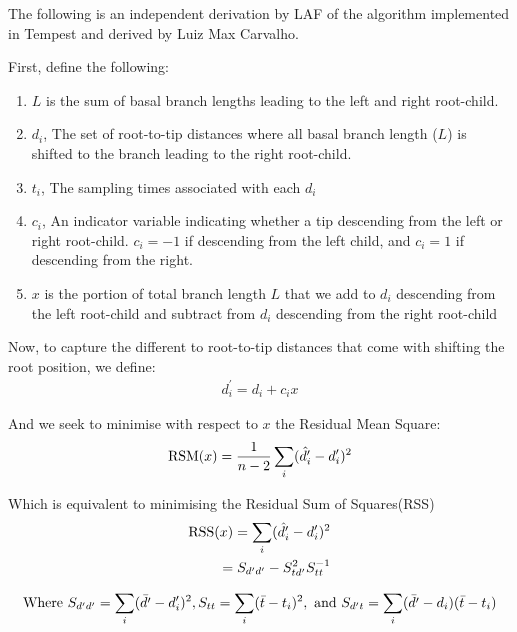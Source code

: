 \documentclass{article}
\begin{document}
The following is an independent derivation by LAF of the algorithm implemented in Tempest and derived by Luiz Max Carvalho.

First, define the following:
\begin{enumerate}

    \item $L$ is the sum of basal branch lengths leading to the left and right root-child.
    \item {$d_i$}, The set of root-to-tip distances where all basal branch length ($L$) is shifted to the branch leading to the right root-child.
    \item {$t_i$}, The sampling times associated with each $d_i$
    \item {$c_i$}, An indicator variable indicating whether a tip descending from the left or right root-child. $c_i = -1$ if descending from the left child, and $c_i = 1$ if descending from the right.
    \item $x$ is the portion of total branch length $L$ that we add to $d_i$ descending from the left root-child and subtract from $d_i$ descending from the right root-child
\end{enumerate}

Now, to capture the different to root-to-tip distances that come with shifting the root position, we define:
\begin{equation}
\begin{aligned}
    d^{\prime}_i = d_{i} + c_{i}x
\end{aligned}
\end{equation}

And we seek to minimise with respect to $x$ the Residual Mean Square:
\begin{equation}
    \textnormal{RSM}(x) = \frac{1}{n-2}\sum_{i}(\hat{d^{\prime}_i} - d^{\prime}_i)^2
\end{equation}

Which is equivalent to minimising the Residual Sum of Squares(RSS)
\begin{equation}
\begin{aligned}
    \textnormal{RSS}(x) = \sum_{i}(\hat{d^{\prime}_i} - d^{\prime}_i)^2 \\
    = S_{d^{\prime}d^{\prime}} - S_{td^{\prime}}^2S_{tt}^{-1}
\end{aligned}
\end{equation}

\begin{equation}
\begin{aligned}
        \textnormal{Where } S_{d^{\prime}d^{\prime}} = \sum_{i}(\bar{d^{\prime}} - d^{\prime}_i)^2,
        S_{tt}= \sum_{i}(\bar{t} - t_i)^2, \textnormal{ and } 
        S_{d^{\prime}t} = \sum_{i}(\bar{d^{\prime}}-d_i)(\bar{t}-t_i)
\end{aligned}
\end{equation}
\end{document}
